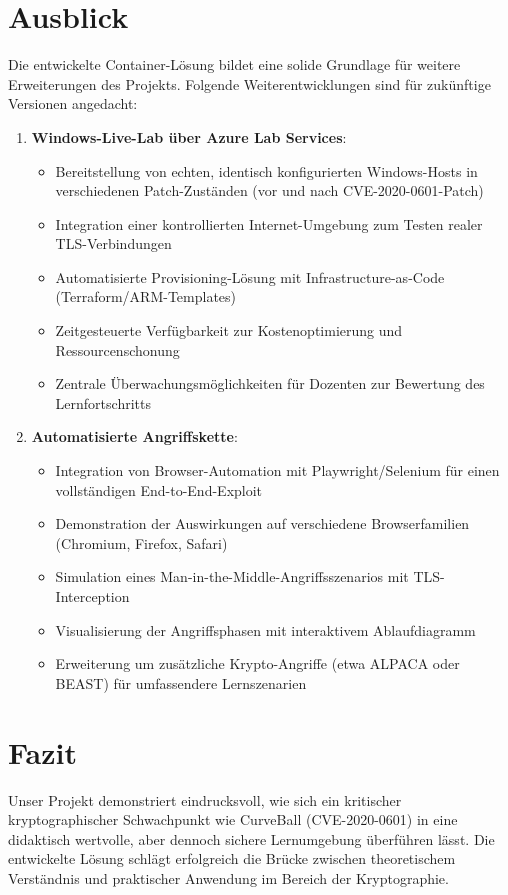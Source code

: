 \documentclass{article}
\begin{document}
\newpage

\section{Ausblick}
Die entwickelte Container-Lösung bildet eine solide Grundlage für weitere Erweiterungen des Projekts. Folgende Weiterentwicklungen sind für zukünftige Versionen angedacht:

\begin{enumerate}
  \item \textbf{Windows-Live-Lab über Azure Lab Services}: 
  \begin{itemize}
    \item Bereitstellung von echten, identisch konfigurierten Windows-Hosts in verschiedenen Patch-Zuständen (vor und nach CVE-2020-0601-Patch)
    \item Integration einer kontrollierten Internet-Umgebung zum Testen realer TLS-Verbindungen
    \item Automatisierte Provisioning-Lösung mit Infrastructure-as-Code (Terraform/ARM-Templates)
    \item Zeitgesteuerte Verfügbarkeit zur Kostenoptimierung und Ressourcenschonung
    \item Zentrale Überwachungsmöglichkeiten für Dozenten zur Bewertung des Lernfortschritts
  \end{itemize}
  
  \item \textbf{Automatisierte Angriffskette}: 
  \begin{itemize}
    \item Integration von Browser-Automation mit Playwright/Selenium für einen vollständigen End-to-End-Exploit
    \item Demonstration der Auswirkungen auf verschiedene Browserfamilien (Chromium, Firefox, Safari)
    \item Simulation eines Man-in-the-Middle-Angriffsszenarios mit TLS-Interception
    \item Visualisierung der Angriffsphasen mit interaktivem Ablaufdiagramm
    \item Erweiterung um zusätzliche Krypto-Angriffe (etwa ALPACA oder BEAST) für umfassendere Lernszenarien
  \end{itemize}

\end{enumerate}

\newpage

\section{Fazit}
Unser Projekt demonstriert eindrucksvoll, wie sich ein kritischer kryptographischer Schwachpunkt wie CurveBall (CVE-2020-0601) in eine didaktisch wertvolle, aber dennoch sichere Lernumgebung überführen lässt. Die entwickelte Lösung schlägt erfolgreich die Brücke zwischen theoretischem Verständnis und praktischer Anwendung im Bereich der Kryptographie.
\end{document}
